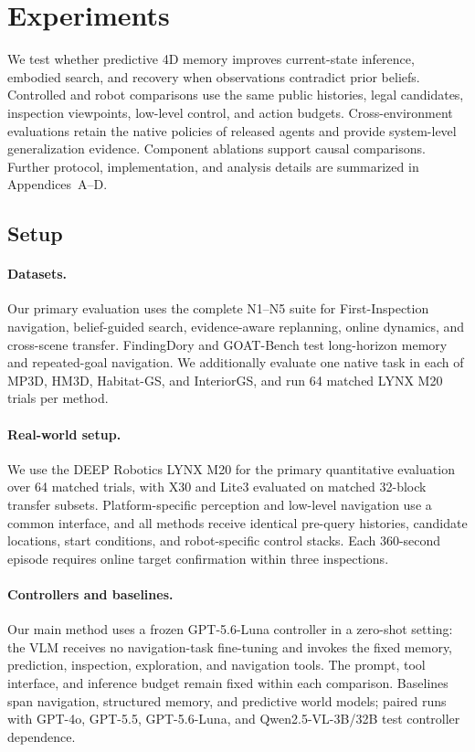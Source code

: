 \section{Experiments}
\label{sec:experiments}

We test whether predictive 4D memory improves current-state inference,
embodied search, and recovery when observations contradict prior beliefs. Controlled
\evolvingworldbench{} and robot comparisons use the same public histories, legal candidates,
inspection viewpoints, low-level control, and action budgets. Cross-environment
evaluations retain the native policies of released agents and provide
system-level generalization evidence. Component ablations support causal
comparisons. Further protocol, implementation, and analysis details are
summarized in Appendices~A--D.

\subsection{Setup}
\label{sec:setup}

\paragraph{Datasets.}
Our primary evaluation uses the complete \evolvingworldbench{} N1--N5 suite for
First-Inspection navigation, belief-guided search, evidence-aware replanning,
online dynamics, and cross-scene transfer. FindingDory
\citep{yadav2025findingdory} and GOAT-Bench \citep{khanna2024goatbench} test
long-horizon memory and repeated-goal navigation. We additionally evaluate one
native task in each of MP3D, HM3D, Habitat-GS, and InteriorGS, and run 64
matched LYNX M20 trials per method.

\paragraph{Real-world setup.}
We use the DEEP Robotics LYNX M20 for the primary quantitative
evaluation over 64 matched trials, with X30 and Lite3 evaluated on matched
32-block transfer subsets. Platform-specific perception and low-level
navigation use a common interface, and all methods receive
identical pre-query histories, candidate locations, start conditions, and
robot-specific control stacks. Each 360-second episode requires online
target confirmation within three inspections.

\paragraph{Controllers and baselines.}
Our main method uses a frozen GPT-5.6-Luna controller in a zero-shot setting:
the VLM receives no navigation-task fine-tuning and invokes the fixed memory,
prediction, inspection, exploration, and navigation tools. The prompt, tool
interface, and inference budget remain fixed within each comparison. Baselines
span navigation, structured memory, and predictive world models; paired runs
with GPT-4o, GPT-5.5, GPT-5.6-Luna, and Qwen2.5-VL-3B/32B test controller
dependence.


